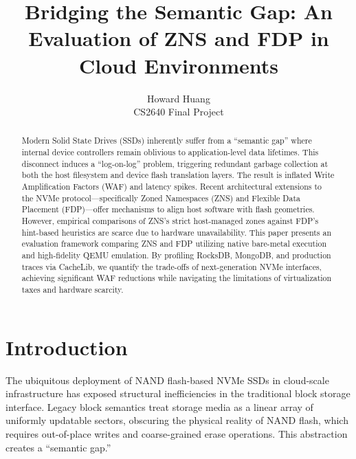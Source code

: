 \documentclass[letterpaper,twocolumn,10pt]{article}
\begin{document}

\date{}

\title{\Large \bf Bridging the Semantic Gap: An Evaluation of ZNS and FDP in Cloud Environments}

\author{
{\rm Howard Huang}\\
CS2640 Final Project
}

\maketitle

\begin{abstract}
Modern Solid State Drives (SSDs) inherently suffer from a ``semantic gap'' where internal device controllers remain oblivious to application-level data lifetimes. This disconnect induces a ``log-on-log'' problem, triggering redundant garbage collection at both the host filesystem and device flash translation layers. The result is inflated Write Amplification Factors (WAF) and latency spikes. Recent architectural extensions to the NVMe protocol—specifically Zoned Namespaces (ZNS) and Flexible Data Placement (FDP)—offer mechanisms to align host software with flash geometries. However, empirical comparisons of ZNS's strict host-managed zones against FDP's hint-based heuristics are scarce due to hardware unavailability. This paper presents an evaluation framework comparing ZNS and FDP utilizing native bare-metal execution and high-fidelity QEMU emulation. By profiling RocksDB, MongoDB, and production traces via CacheLib, we quantify the trade-offs of next-generation NVMe interfaces, achieving significant WAF reductions while navigating the limitations of virtualization taxes and hardware scarcity.
\end{abstract}


\section{Introduction}
The ubiquitous deployment of NAND flash-based NVMe SSDs in cloud-scale infrastructure has exposed structural inefficiencies in the traditional block storage interface. Legacy block semantics treat storage media as a linear array of uniformly updatable sectors, obscuring the physical reality of NAND flash, which requires out-of-place writes and coarse-grained erase operations. This abstraction creates a ``semantic gap.''
\end{document}
